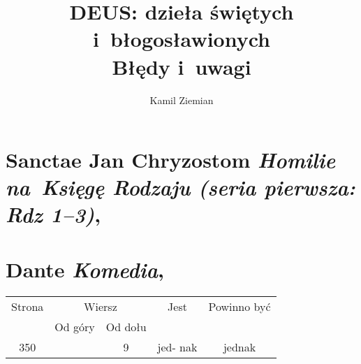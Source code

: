 \documentclass[a4paper,11pt]{article}
\title{DEUS: dzieła świętych i~błogosławionych \\
  {\Large Błędy i~uwagi}}
\author{Kamil Ziemian}
\numberwithin{equation}{section}
\begin{document}





\maketitle





\section{Sanctae Jan Chryzostom
  \textit{Homilie na~Księgę Rodzaju (seria pierwsza: Rdz 1--3)},
  \parencite{SancteJanChryzostomHomKsiegaRodzaju2008}}











\section{Dante \textit{Komedia}, \cite{DAK}}






\begin{center}

  \begin{tabular}{|c|c|c|c|c|}
    \hline
    Strona & \multicolumn{2}{c|}{Wiersz} & Jest
                              & Powinno być \\ \cline{2-3}
    & Od góry & Od dołu & & \\
    \hline
    350 & & 9 & jed- nak & jednak \\
    \hline
  \end{tabular}

\end{center}
\end{document}
